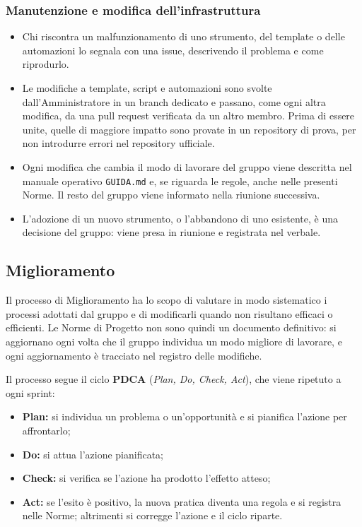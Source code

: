 \documentclass[documento]{gpt}
\begin{document}
	\subsubsection{Manutenzione e modifica dell'infrastruttura}
	\begin{itemize}
		\item Chi riscontra un malfunzionamento di uno strumento, del template o
		delle automazioni lo segnala con una issue, descrivendo il problema e
		come riprodurlo.
		\item Le modifiche a template, script e automazioni sono svolte
		dall'Amministratore in un branch dedicato e passano, come ogni altra
		modifica, da una pull request verificata da un altro membro. Prima
		di essere unite, quelle di maggiore impatto sono provate in un
		repository di prova, per non introdurre errori nel repository
		ufficiale.
		\item Ogni modifica che cambia il modo di lavorare del gruppo viene
		descritta nel manuale operativo \texttt{GUIDA.md} e, se riguarda le
		regole, anche nelle presenti Norme. Il resto del gruppo viene
		informato nella riunione successiva.
		\item L'adozione di un nuovo strumento, o l'abbandono di uno esistente, è
		una decisione del gruppo: viene presa in riunione e registrata nel
		verbale.
	\end{itemize}
	
	
	\subsection{Miglioramento}
	Il processo di Miglioramento ha lo scopo di valutare in modo sistematico i
	processi adottati dal gruppo e di modificarli quando non risultano efficaci o
	efficienti. Le Norme di Progetto non sono quindi un documento definitivo: si
	aggiornano ogni volta che il gruppo individua un modo migliore di lavorare, e
	ogni aggiornamento è tracciato nel registro delle modifiche.
	
	Il processo segue il ciclo \textbf{PDCA} (\textit{Plan, Do, Check, Act}), che
	viene ripetuto a ogni sprint:
	\begin{itemize}
		\item \textbf{Plan:} si individua un problema o un'opportunità e si
		pianifica l'azione per affrontarlo;
		\item \textbf{Do:} si attua l'azione pianificata;
		\item \textbf{Check:} si verifica se l'azione ha prodotto l'effetto atteso;
		\item \textbf{Act:} se l'esito è positivo, la nuova pratica diventa una
		regola e si registra nelle Norme; altrimenti si corregge l'azione e
		il ciclo riparte.
	\end{itemize}
	
\end{document}
